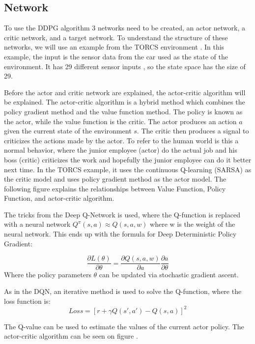 \subsection{Network}
To use the DDPG algorithm 3 networks need to be created, an actor network, a critic network, and a target network. To understand the structure of these networks, we will use an example from the TORCS environment \cite{DDPG_Torcs}. In this example, the input is the sensor data from the car used as the state of the environment. It has 29 different sensor inputs \cite{Data_from_Torcs}, so the state space has the size of 29.  

Before the actor and critic network are explained, the actor-critic algorithm will be explained. The actor-critic algorithm is a hybrid method which combines the policy gradient method and the value function method. The policy is known as the actor, while the value function is the critic. The actor produces an action $a$ given the current state of the environment $s$. The critic then produces a signal to criticizes the actions made by the actor. To refer to the human world is this a normal behavior, where the junior employee (actor) do the actual job and his boss (critic) criticizes the work and hopefully the junior employee can do it better next time. In the TORCS example, it uses the continuous Q-learning (SARSA) as the critic model and uses policy gradient method as the actor model. The following figure explains the relationships between Value Function, Policy Function, and actor-critic algorithm.    

The tricks from the Deep Q-Network is used, where the Q-function is replaced with a neural network $Q^\pi(s,a) \approx Q(s,a,w)$ where w is the weight of the neural network. This ends up with the formula for Deep Deterministic Policy Gradient:
 
\begin{equation}
\frac{\partial L(\theta)}{\partial \theta} =\frac{\partial Q(s,a,w)}{\partial a} \frac{\partial a}{\partial \theta}
\end{equation}
Where the policy parameters $\theta$ can be updated via stochastic gradient ascent.

As in the DQN, an iterative method is used to solve the Q-function, where the loss function is:
\begin{equation}
Loss = [r + \gamma Q(s',a') - Q(s,a)]^2
\end{equation} 

The Q-value can be used to estimate the values of the current actor policy. The actor-critic algorithm can be seen on figure . 

